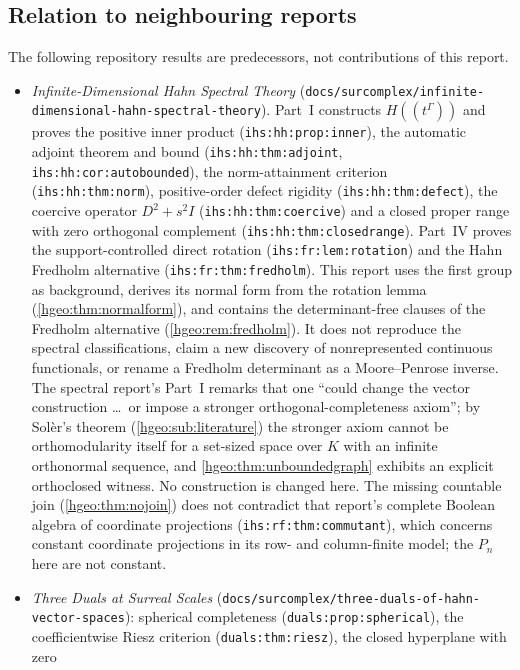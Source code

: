\documentclass[11pt,letterpaper]{article}
\numberwithin{equation}{section}
\theoremstyle{definition}
\theoremstyle{remark}
\newcommand{\K}{K}
\newcommand{\replabel}[1]{\nolinkurl{#1}}
\newcommand{\fn}[1]{\nolinkurl{#1}}
\begin{document}
\subsection{Relation to neighbouring reports}\label{hgeo:sub:neighbours}
The following repository results are predecessors, not contributions of this
report.
\begin{itemize}[leftmargin=*]
\item \emph{Infinite-Dimensional Hahn Spectral Theory}
(\fn{docs/surcomplex/infinite-dimensional-hahn-spectral-theory}). Part~I
constructs $H((t^\Gamma))$ and proves the positive inner product
(\replabel{ihs:hh:prop:inner}), the automatic adjoint theorem and bound
(\replabel{ihs:hh:thm:adjoint}, \replabel{ihs:hh:cor:autobounded}), the
norm-attainment criterion (\replabel{ihs:hh:thm:norm}), positive-order defect
rigidity (\replabel{ihs:hh:thm:defect}), the coercive operator $D^2+s^2I$
(\replabel{ihs:hh:thm:coercive}) and a closed proper range with zero
orthogonal complement (\replabel{ihs:hh:thm:closedrange}). Part~IV proves
the support-controlled direct rotation (\replabel{ihs:fr:lem:rotation}) and the
Hahn Fredholm alternative (\replabel{ihs:fr:thm:fredholm}). This report uses
the first group as background, derives its normal form from the rotation lemma
(\cref{hgeo:thm:normalform}), and contains the determinant-free clauses of the
Fredholm alternative (\cref{hgeo:rem:fredholm}). It does not reproduce the
spectral classifications, claim a new discovery of nonrepresented continuous
functionals, or rename a Fredholm determinant as a Moore--Penrose inverse.
The spectral report's Part~I remarks that one ``could change the vector
construction \ldots\ or impose a stronger orthogonal-completeness axiom'';
by Sol\`er's theorem (\cref{hgeo:sub:literature}) the stronger axiom cannot be
orthomodularity itself for a set-sized space over $\K$ with an infinite
orthonormal sequence, and \cref{hgeo:thm:unboundedgraph} exhibits an
explicit orthoclosed witness. No construction is changed here. The missing
countable join (\cref{hgeo:thm:nojoin}) does not contradict that report's
complete Boolean algebra of coordinate projections
(\replabel{ihs:rf:thm:commutant}), which concerns constant coordinate
projections in its row- and column-finite model; the $P_n$ here are not
constant.
\item \emph{Three Duals at Surreal Scales}
(\fn{docs/surcomplex/three-duals-of-hahn-vector-spaces}): spherical
completeness (\replabel{duals:prop:spherical}), the coefficientwise Riesz
criterion (\replabel{duals:thm:riesz}), the closed hyperplane with zero

\end{itemize}
\end{document}
